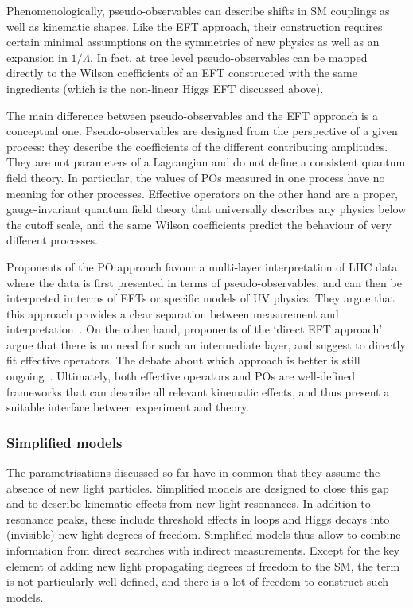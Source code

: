 Phenomenologically, pseudo-observables can describe shifts in SM
couplings as well as kinematic shapes. Like the EFT approach, their
construction requires certain minimal assumptions on the symmetries of
new physics as well as an expansion in $1/\Lambda$. In fact, at tree
level pseudo-observables can be mapped directly to the Wilson
coefficients of an EFT constructed with the same ingredients (which is
the non-linear Higgs EFT discussed above).

The main difference between pseudo-observables and the EFT approach is
a conceptual one. Pseudo-observables are designed from the perspective
of a given process: they describe the coefficients of the different
contributing amplitudes. They are not parameters of a Lagrangian and
do not define a consistent quantum field theory. In particular, the
values of POs measured in one process have no meaning for other
processes. Effective operators on the other hand are a proper,
gauge-invariant quantum field theory that universally describes any
physics below the cutoff scale, and the same Wilson coefficients
predict the behaviour of very different processes.

Proponents of the PO approach favour a multi-layer interpretation of
LHC data, where the data is first presented in terms of
pseudo-observables, and can then be interpreted in terms of EFTs or
specific models of UV physics. They argue that this approach provides
a clear separation between measurement and
interpretation~\cite{deFlorian:2016spz}. On the other hand, proponents
of the `direct EFT approach' argue that there is no need for such an
intermediate layer, and suggest to directly fit effective
operators. The debate about which approach is better is still
ongoing~\cite{deFlorian:2016spz}. Ultimately, both effective operators
and POs are well-defined frameworks that can describe all relevant
kinematic effects, and thus present a suitable interface between
experiment and theory.



\subsubsection{Simplified models}

The parametrisations discussed so far have in common that they assume
the absence of new light particles. Simplified models are designed to
close this gap and to describe kinematic effects from new light
resonances. In addition to resonance peaks, these include threshold
effects in loops and Higgs decays into (invisible) new light degrees
of freedom. Simplified models thus allow to combine information from
direct searches with indirect measurements. Except for the key element
of adding new light propagating degrees of freedom to the SM, the term
is not particularly well-defined, and there is a lot of freedom to
construct such models.

